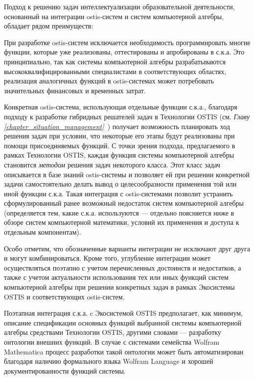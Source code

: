 Подход к решению задач интеллектуализации образовательной деятельности, основанный на интеграции ostis-систем и систем компьютерной алгебры, обладает рядом преимуществ:
\begin{textitemize}
	\item При разработке ostis-систем исключается необходимость программировать многие функции, которые уже реализованы, оттестированы и апробированы в с.к.а. Это принципиально, так как системы компьютерной алгебры разрабатываются высококвалифицированными специалистами в соответствующих областях, реализация аналогичных функций в ostis-системах может потребовать значительных финансовых и временных затрат.
	\item Конкретная ostis-система, использующая отдельные функции с.к.а., благодаря подходу к разработке гибридных решателей задач в Технологии OSTIS (см. \textit{Главу \ref{chapter_situation_management}~}) получает возможность  планировать ход решения задач при условии, что некоторые его этапы будут реализованы при помощи присоединяемых функций. С точки зрения подхода, предлагаемого в рамках Технологии OSTIS, каждая функция системы компьютерной алгебры становится \textit{методом} решения задач некоторого класса. Этот класс задач описывается в базе знаний ostis-системы и позволяет ей при решении конкретной задачи самостоятельно делать вывод о целесообразности применения той или иной функции с.к.а. Такая интеграция с ostis-системами позволит устранить сформулированный ранее возможный недостаток систем компьютерной алгебры (определяется тем, какие с.к.а. используются --- отдельно поясняется ниже в обзоре систем компьютерной математики, условий их применения и доступа к отдельным компонентам).
\end{textitemize}

Особо отметим, что обозначенные варианты интеграции не исключают друг друга и могут комбинироваться. Кроме того, углубление интеграции может осуществляться поэтапно с учетом перечисленных достоинств и недостатков, а также с учетом актуальности использования тех или иных функций систем компьютерной алгебры при решении конкретных задач в рамках Экосистемы OSTIS и соответствующих ostis-систем.

Поэтапная интеграция с.к.а. c Экосистемой OSTIS предполагает, как минимум, описание спецификации основных функций выбранной системы компьютерной алгебры средствами Технологии OSTIS, другими словами --- разработку онтологии внешних функций. В случае с системами семейства Wolfram Mathematica процесс разработки такой онтологии может быть автоматизирован благодаря наличию формального языка Wolfram Language и хорошей документированности функций системы.

